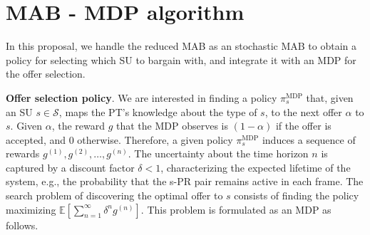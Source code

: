 


\section{MAB - MDP algorithm}\label{sec:MAB}
In this proposal, we handle the reduced MAB as an stochastic MAB to obtain a policy for selecting which SU to bargain with, and integrate it with an MDP for the offer selection.

\textbf{Offer selection policy}.
We are interested in finding a policy $\pi_s^{\text{MDP}}$ that, given an SU $s\in\mathcal{S}$, maps the PT's knowledge about the type of $s$, to the next offer $\alpha$ to $s$.
Given $\alpha$, the reward $g$ that the MDP observes is $(1-\alpha)$ if the offer is accepted, and $0$ otherwise.
Therefore, a given policy $\pi_s^{\text{MDP}}$ induces a sequence of rewards $g^{(1)}, g^{(2)},\ldots,g^{(n)}$.
The uncertainty about the time horizon $n$ is captured by a discount factor $\delta<1$, characterizing the expected lifetime of the system, e.g., the probability that the s-PR pair remains active in each frame.
The search problem of discovering the optimal offer to $s$ consists of finding the policy maximizing $\mathbb{E}\left[\sum_{n=1}^{\infty}\delta^{n}g^{(n)}\right]$.
This problem is formulated as an MDP as follows.


